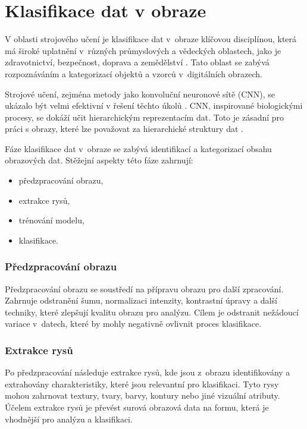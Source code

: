 \section{Klasifikace dat v obraze}

V oblasti strojového učení je klasifikace dat v~obraze klíčovou disciplínou, která má široké uplatnění v~různých průmyslových a vědeckých oblastech, jako je zdravotnictví, bezpečnost, doprava a zemědělství \cite{liu2020}. Tato oblast se zabývá rozpoznáváním a kategorizací objektů a vzorců v~digitálních obrazech.

Strojové učení, zejména metody jako konvoluční neuronové sítě (CNN), se ukázalo být velmi efektivní v řešení těchto úkolů \cite{krizhevsky2012}. CNN, inspirované biologickými procesy, se dokáží učit hierarchickým reprezentacím dat. Toto je zásadní pro práci s obrazy, které lze považovat za hierarchické struktury dat \cite{lecun2015}.

Fáze klasifikace dat v~obraze se zabývá identifikací a kategorizací obsahu obrazových dat. Stěžejní aspekty této fáze zahrnují:

\begin{itemize}
    \item předzpracování obrazu,
    \item extrakce rysů,
    \item trénování modelu,
    \item klasifikace.
\end{itemize}

\subsubsection{Předzpracování obrazu}
Předzpracování obrazu se soustředí na přípravu obrazu pro další zpracování. Zahrnuje odstranění šumu, normalizaci intenzity, kontrastní úpravy a další techniky, které zlepšují kvalitu obrazu pro analýzu. Cílem je odstranit nežádoucí variace v~datech, které by mohly negativně ovlivnit proces klasifikace.

\subsubsection{Extrakce rysů}
Po předzpracování následuje extrakce rysů, kde jsou z~obrazu identifikovány a extrahovány charakteristiky, které jsou relevantní pro klasifikaci. Tyto rysy mohou zahrnovat textury, tvary, barvy, kontury nebo jiné vizuální atributy. Účelem extrakce rysů je převést surová obrazová data na formu, která je vhodnější pro analýzu a klasifikaci.

